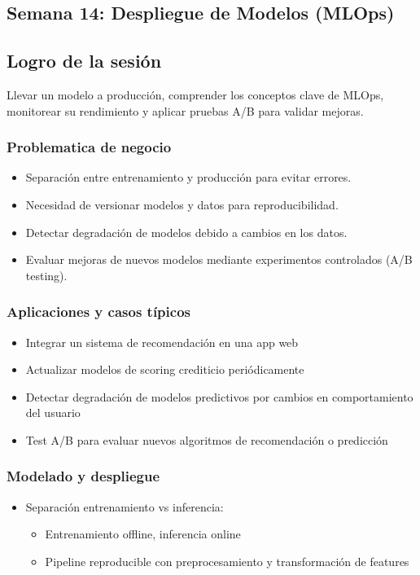 \documentclass[12pt,a4paper,openany,oneside]{book}
\begin{document}
\begin{itemize}
\chapter{Semana 14: Despliegue de Modelos (MLOps)}

\section{Logro de la sesión}
Llevar un modelo a producción, comprender los conceptos clave de MLOps, monitorear su rendimiento y aplicar pruebas A/B para validar mejoras.

\subsection{Problematica de negocio}
\begin{itemize}
    \item Separación entre entrenamiento y producción para evitar errores.
    \item Necesidad de versionar modelos y datos para reproducibilidad.
    \item Detectar degradación de modelos debido a cambios en los datos.
    \item Evaluar mejoras de nuevos modelos mediante experimentos controlados (A/B testing).
\end{itemize}

\subsection{Aplicaciones y casos típicos}
\begin{itemize}
    \item Integrar un sistema de recomendación en una app web
    \item Actualizar modelos de scoring crediticio periódicamente
    \item Detectar degradación de modelos predictivos por cambios en comportamiento del usuario
    \item Test A/B para evaluar nuevos algoritmos de recomendación o predicción
\end{itemize}

\subsection{Modelado y despliegue}
\begin{itemize}
    \item Separación entrenamiento vs inferencia:
    \begin{itemize}
        \item Entrenamiento offline, inferencia online
        \item Pipeline reproducible con preprocesamiento y transformación de features
    \end{itemize}


\end{itemize}
\end{itemize}
\end{document}
